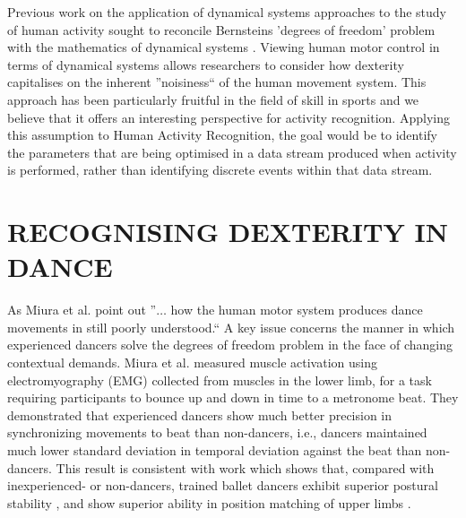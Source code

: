\documentclass{sigchi}
\begin{document}
Previous work on the application of dynamical systems approaches to the study of human activity sought to 
reconcile Bernsteins  \cite{Bernstein1967} 'degrees of freedom' problem with the mathematics 
of dynamical systems \cite{Kugler1982}.
Viewing human motor control in terms of 
dynamical systems allows researchers to consider how dexterity capitalises on the inherent ''noisiness`` of the human 
movement system. This approach has been particularly fruitful in the field of skill in sports \cite{Davids2003}
and we believe that it offers an interesting perspective for activity recognition. 
Applying this assumption to Human Activity Recognition, the goal would be to identify the parameters that are being 
optimised in a data stream produced when activity is performed, rather than identifying 
discrete events within that data stream. 
 

\section{RECOGNISING DEXTERITY IN DANCE }
As Miura et al. \cite{Miura2015} point out ''$\ldots$ how the human motor system produces dance movements in still 
poorly understood.`` A key issue concerns the manner in which experienced dancers solve the degrees of freedom 
problem in the face of changing contextual demands.  Miura et al. \cite{Miura2013} measured muscle activation 
using electromyography (EMG) collected from muscles in the lower limb, for a task requiring participants to 
bounce up and down in time to a metronome beat.  They demonstrated that experienced dancers show much better 
precision in synchronizing movements to beat than non-dancers, i.e., dancers maintained much lower standard 
deviation in temporal deviation against the beat than non-dancers. This result is consistent with work which 
shows that, compared with inexperienced- or non-dancers, trained ballet dancers exhibit superior postural 
stability \cite{Crotts1996} %
, and show superior ability in position matching of upper limbs \cite{Ramsay2001}.%
\end{document}
